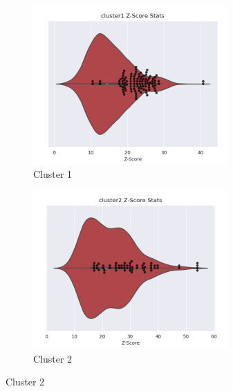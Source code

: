  \begin{figure}[htb]
    
    \centering %
\begin{subfigure}{0.2\textwidth}
  \includegraphics[width=\linewidth]{Pfam/cl01.png}
  \caption{Cluster 1}
  \label{fig:cl01}
\end{subfigure}\hfil %
\begin{subfigure}{0.2\textwidth}
  \includegraphics[width=\linewidth]{Pfam/cl02.png}
  \caption{Cluster 2}
  \label{fig:cl02}
\end{subfigure}\hfil %

\end{figure}
